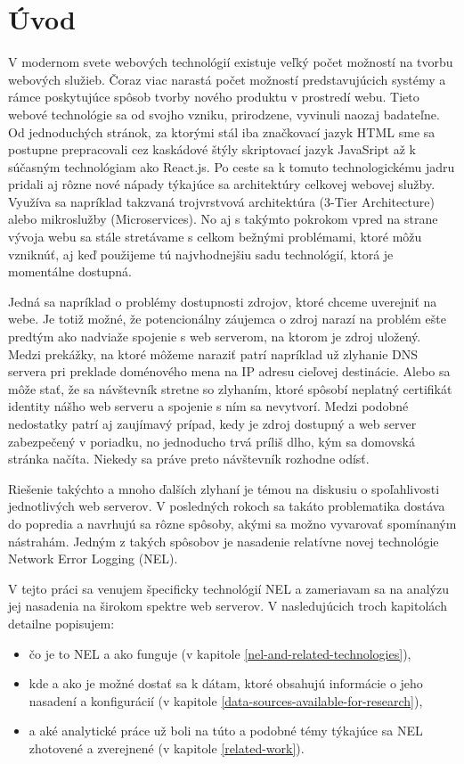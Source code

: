 \chapter{Úvod}
\label{uvod}
\vspace{1cm}

V modernom svete webových technológií existuje veľký počet možností na tvorbu webových služieb. Čoraz viac narastá počet možností predstavujúcich systémy a rámce poskytujúce spôsob tvorby nového produktu v prostredí webu.
Tieto webové technológie sa od svojho vzniku, prirodzene, vyvinuli naozaj badateľne. 
Od jednoduchých stránok, za ktorými stál iba značkovací jazyk 
HTML sme sa postupne prepracovali cez kaskádové štýly skriptovací jazyk 
JavaSript až k súčasným technológiam ako React.js. 
Po ceste sa k tomuto technologickému jadru pridali aj rôzne 
nové nápady týkajúce sa architektúry celkovej webovej služby. 
Využíva sa napríklad takzvaná trojvrstvová architektúra (3-Tier Architecture) alebo mikroslužby (Microservices). 
No aj s takýmto pokrokom vpred na strane vývoja webu sa stále stretávame s celkom bežnými problémami, ktoré môžu vzniknúť, aj 
keď použijeme tú najvhodnejšiu sadu technológií, ktorá je momentálne dostupná.

Jedná sa napríklad o problémy dostupnosti zdrojov, ktoré chceme uverejniť na webe. 
Je totiž možné, že potencionálny záujemca o zdroj narazí na problém ešte predtým ako nadviaže spojenie s web serverom, na ktorom je zdroj uložený.
Medzi prekážky, na ktoré môžeme naraziť patrí napríklad už zlyhanie DNS servera pri preklade doménového mena na IP adresu cieľovej destinácie. 
Alebo sa môže stať, že sa návštevník stretne so zlyhaním, ktoré spôsobí neplatný certifikát identity nášho web serveru a spojenie s ním sa nevytvorí. 
Medzi podobné nedostatky patrí aj zaujímavý prípad, kedy je zdroj dostupný a web server zabezpečený v poriadku, no jednoducho trvá príliš dlho, kým sa domovská stránka načíta. Niekedy sa práve preto návštevník rozhodne odísť.

Riešenie takýchto a mnoho ďalších zlyhaní je témou na diskusiu o spoľahlivosti jednotlivých web serverov. 
V posledných rokoch sa takáto problematika dostáva do popredia a navrhujú sa rôzne 
spôsoby, akými sa možno vyvarovať spomínaným nástrahám. Jedným z takých spôsobov je nasadenie relatívne novej 
technológie Network Error Logging (NEL).

\pagebreak

V tejto práci sa venujem špecificky technológií NEL a zameriavam sa na analýzu jej nasadenia na širokom spektre web serverov. 
V nasledujúcich troch kapitolách detailne popisujem:
\begin{itemize}
    \item čo je to NEL a ako funguje (v kapitole \ref{nel-and-related-technologies}),
    \item kde a ako je možné dostať sa k dátam, ktoré obsahujú informácie o jeho nasadení a 
konfigurácií (v kapitole \ref{data-sources-available-for-research}),
    \item a aké analytické práce už boli na túto a podobné témy
týkajúce sa NEL zhotovené a zverejnené (v kapitole \ref{related-work}).
\end{itemize}

